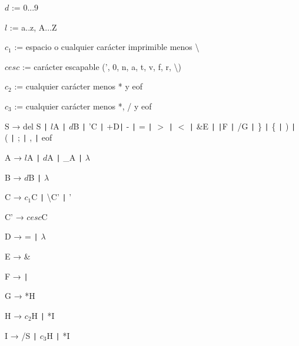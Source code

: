 \begin{center}
    \begin{tcolorbox}[title=Símbolos no terminales, width=0.57\textwidth]
        $d$ := 0...9
        
        $l$ := a..z, A...Z
        
        $c_1$ := espacio o cualquier carácter imprimible menos \textbackslash
        
        $cesc$ := carácter escapable (', 0, n, a, t, v, f, r, \textbackslash )
        
        $c_2$ := cualquier carácter menos * y eof
        
        $c_3$ := cualquier carácter menos *, / y eof
    \end{tcolorbox}
\end{center}

\begin{tcolorbox}[title=Gramática Regular]
    \hspace{0.5cm} S → del S \texttt{|} $l$A \texttt{|} $d$B \texttt{|} 'C \texttt{|} +D\texttt{|} - \texttt{|} = \texttt{|} \(>\) \texttt{|} \(<\) \texttt{|} \&E \texttt{|} \texttt{|}F \texttt{|} /G \texttt{|} \} \texttt{|} \{ \texttt{|} ) \texttt{|} ( \texttt{|} ; \texttt{|} , \texttt{|} eof
    
    \hspace{0.5cm} A → $l$A \texttt{|} $d$A \texttt{|} \_A \texttt{|} \( \lambda \)
    
    \hspace{0.5cm} B → $d$B \texttt{|} \( \lambda \)
    
    \hspace{0.5cm} C → $c_1$C \texttt{|} \textbackslash C' \texttt{|} '
    
    \hspace{0.5cm} C' → $cesc$C
    
    \hspace{0.5cm} D → = \texttt{|} \( \lambda \)
    
    \hspace{0.5cm} E → \&
    
    \hspace{0.5cm} F → \texttt{|}
    
    \hspace{0.5cm} G → *H
    
    \hspace{0.5cm} H → $c_2$H \texttt{|} *I
    
    \hspace{0.5cm} I → /S \texttt{|} $c_3$H \texttt{|} *I
\end{tcolorbox}